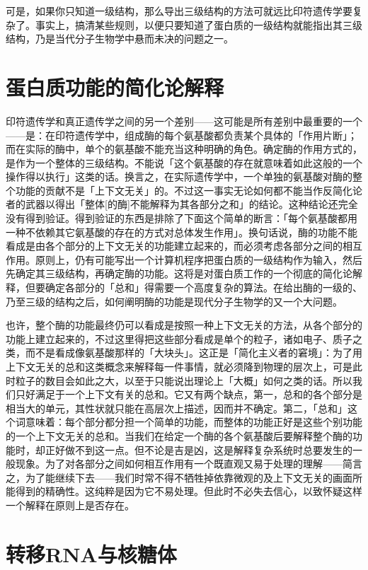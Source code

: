 \documentclass[
  12pt,
  twoside,
  openright,
  oldfontcommands,
]{memoir}
\begin{document}
可是，如果你只知道一级结构，那么导出三级结构的方法可就远比印符遗传学要复杂了。事实上，搞清某些规则，以便只要知道了蛋白质的一级结构就能指出其三级结构，乃是当代分子生物学中悬而未决的问题之一。

\section{蛋白质功能的简化论解释}

印符遗传学和真正遗传学之间的另一个差别------这可能是所有差别中最重要的一个------是：在印符遗传学中，组成酶的每个氨基酸都负责某个具体的「作用片断」；而在实际的酶中，单个的氨基酸不能充当这种明确的角色。确定酶的作用方式的，是作为一个整体的三级结构。不能说「这个氨基酸的存在就意味着如此这般的一个操作得以执行」这类的话。换言之，在实际遗传学中，一个单独的氨基酸对酶的整个功能的贡献不是「上下文无关」的。不过这一事实无论如何都不能当作反简化论者的武器以得出「整体{[}的酶{]}不能解释为其各部分之和」的结论。这种结论还完全没有得到验证。得到验证的东西是排除了下面这个简单的断言：「每个氨基酸都用一种不依赖其它氨基酸的存在的方式对总体发生作用」。换句话说，酶的功能不能看成是由各个部分的上下文无关的功能建立起来的，而必须考虑各部分之间的相互作用。原则上，仍有可能写出一个计算机程序把蛋白质的一级结构作为输入，然后先确定其三级结构，再确定酶的功能。这将是对蛋白质工作的一个彻底的简化论解释，但要确定各部分的「总和」得需要一个高度复杂的算法。在给出酶的一级的、乃至三级的结构之后，如何阐明酶的功能是现代分子生物学的又一个大问题。

也许，整个酶的功能最终仍可以看成是按照一种上下文无关的方法，从各个部分的功能上建立起来的，不过这里得把这些部分看成是单个的粒子，诸如电子、质子之类，而不是看成像氨基酸那样的「大块头」。这正是「简化主义者的窘境」：为了用上下文无关的总和这类概念来解释每一件事情，就必须降到物理的层次上，可是此时粒子的数目会如此之大，以至于只能说出理论上「大概」如何之类的话。所以我们只好满足于一个上下文有关的总和。它又有两个缺点，第一，总和的各个部分是相当大的单元，其性状就只能在高层次上描述，因而并不确定。第二，「总和」这个词意味着：每个部分都分担一个简单的功能，而整体的功能正好是这些个别功能的一个上下文无关的总和。当我们在给定一个酶的各个氨基酸后要解释整个酶的功能时，却正好做不到这一点。但不论是吉是凶，这是解释复杂系统时总要发生的一般现象。为了对各部分之间如何相互作用有一个既直观又易于处理的理解------简言之，为了能继续下去------我们时常不得不牺牲掉依靠微观的及上下文无关的画面所能得到的精确性。这纯粹是因为它不易处理。但此时不必失去信心，以致怀疑这样一个解释在原则上是否存在。

\section{转移RNA与核糖体}
\end{document}
